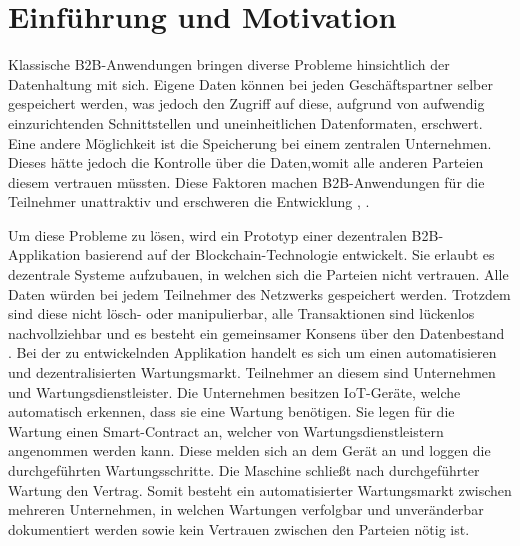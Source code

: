 \chapter{Einführung und Motivation}
\label{cha:einfuehrung}


Klassische B2B-Anwendungen bringen diverse Probleme hinsichtlich der Datenhaltung mit sich. Eigene Daten können bei jeden Geschäftspartner selber gespeichert werden, was jedoch den Zugriff auf diese, aufgrund von aufwendig einzurichtenden Schnittstellen und uneinheitlichen Datenformaten, erschwert. Eine andere Möglichkeit ist die Speicherung bei einem zentralen Unternehmen. Dieses hätte jedoch die Kontrolle über die Daten,womit alle anderen Parteien diesem vertrauen müssten. Diese Faktoren machen B2B-Anwendungen für die Teilnehmer unattraktiv und erschweren die Entwicklung \cite{KorpelaDigitalSupplyChain2017}, \cite{AbeyratneBlockchainreadymanufacturing2016}.

Um diese Probleme zu lösen, wird ein Prototyp einer dezentralen B2B-Applikation basierend auf der Blockchain-Technologie entwickelt. Sie erlaubt es dezentrale Systeme aufzubauen, in welchen sich die Parteien nicht vertrauen. Alle Daten würden bei jedem Teilnehmer des Netzwerks gespeichert werden. Trotzdem sind diese nicht lösch- oder manipulierbar, alle Transaktionen sind lückenlos nachvollziehbar und es besteht ein gemeinsamer Konsens über den Datenbestand \cite{CrosbyBlockChainTechnologyBitcoin2016}. Bei der zu entwickelnden Applikation handelt es sich um einen automatisieren und dezentralisierten Wartungsmarkt. Teilnehmer an diesem sind Unternehmen und Wartungsdienstleister. Die Unternehmen besitzen IoT-Geräte, welche automatisch erkennen, dass sie eine Wartung benötigen. Sie legen für die Wartung einen Smart-Contract an, welcher von Wartungsdienstleistern angenommen werden kann. Diese melden sich an dem Gerät an und loggen die durchgeführten Wartungsschritte. Die Maschine schließt nach durchgeführter Wartung den Vertrag. Somit besteht ein automatisierter Wartungsmarkt zwischen mehreren Unternehmen, in welchen Wartungen verfolgbar und unveränderbar dokumentiert werden sowie kein Vertrauen zwischen den Parteien nötig ist.

